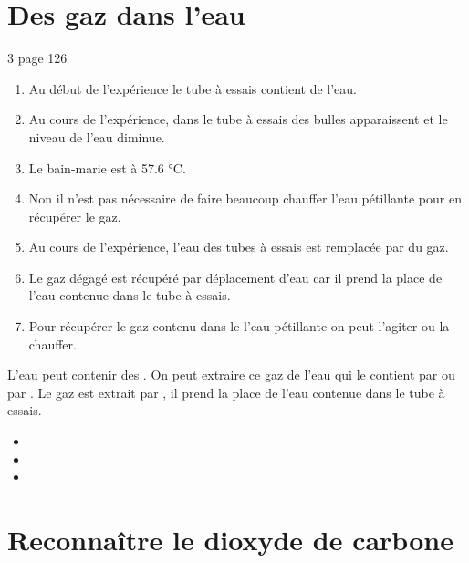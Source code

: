 \documentclass[12pt,a4paper]{article}
\begin{document}
\section{Des gaz dans l'eau}

\begin{myact}{3 page 126}
	\begin{enumerate}
		\item Au début de l'expérience le tube à essais contient de l'eau.
		\item Au cours de l'expérience, dans le tube à essais des bulles apparaissent et le niveau de l'eau diminue.
		\item Le bain-marie est à \num{57.6} °C.
		\item Non il n'est pas nécessaire de faire beaucoup chauffer l'eau pétillante pour en récupérer le gaz.
		\item Au cours de l'expérience, l'eau des tubes à essais est remplacée par du gaz.
		\item Le gaz dégagé est récupéré par déplacement d'eau car il prend la place de l'eau contenue dans le tube à essais.
		\item Pour récupérer le gaz contenu dans le l'eau pétillante on peut l'agiter  ou la chauffer.
	\end{enumerate}
\end{myact}

\begin{mybilan}
	L'eau peut contenir des . On peut extraire ce gaz de l'eau qui le contient par  ou par . Le gaz est extrait par , il prend la place de l'eau contenue dans le tube à essais.
\end{mybilan}

\begin{myexos}
	\begin{multicols}{2}
		
		\begin{itemize}
			\item \exo{}{}
			\item \exo{}{}
			\item \exo{}{}
		\end{itemize}
		
	\end{multicols}
\end{myexos}

\section{Reconnaître le dioxyde de carbone}
\end{document}
